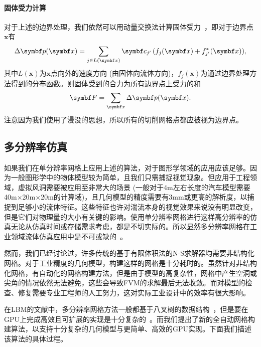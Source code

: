 \paragraph{固体受力计算}
对于上述的边界处理，我们依然可以用动量交换法计算固体受力~\cite{Ladd-1994, Mei-2002}，即对于边界点$\bm{x}$有
\begin{equation}
    \Delta \bm{p}(\bm{x})= \sum_{j\in L(\bm{x})} \bm{c}_{j'}\,(f_{j}(\bm{x}) + f^*_{j'}(\bm{x})),\vspace*{-1.5mm}
\end{equation}
其中$L(\bm{x})$为$\bm{x}$点向外的速度方向 (由固体向流体方向)，$f_{j}(\bm{x})$为通过边界处理方法得到的分布函数。则固体受到的合力为所有边界点上受力的和
\begin{equation}
    \bm{F} = \sum_{\bm{x}} \Delta \bm{p}(\bm{x}).\vspace*{-1mm}
\end{equation}
注意因为我们使用了浸没的思想，所以所有的切削网格点都应被视为边界点。

\subsection{多分辨率仿真}
\label{sec:multi-res}
如果我们在单分辨率网格上应用上述的算法，对于图形学领域的应用应该足够。因为一般图形学中的物体模型较为简单，且我们只需捕捉视觉现象。但应用于工程领域，虚拟风洞需要被应用至非常大的场景 (一般对于4m左右长度的汽车模型需要40m$\times$20m$\times$20m的计算域)，且几何模型的精度需要有3mm或更高的解析度，以捕捉到足够小的流体特征。这些特征也许对湍流本身的视觉效果来说没有明显改变，但是它们对物理量的大小有关键的影响。使用单分辨率网格进行这样高分辨率的仿真无论从仿真时间或存储需求考虑，都是不切实际的。所以显然多分辨率网格在工业领域流体仿真应用中是不可或缺的~\cite{Hou-2019,Aultman-2022,Romani-2022}。

然而，我们已经讨论过，许多传统的基于有限体积法的N-S求解器均需要非结构化网格。对于工业精度的几何模型，构建这样的网格是十分耗时的。虽然针对非结构化网格，有自动化的网格构建方法，但是由于模型的高复杂性，网格中产生空洞或尖角的情况依然无法避免，这些会导致FVM的求解最后无法收敛。而对模型的检查、修复需要专业工程师的人工努力，这对实际工业设计中的效率有很大影响。

在LBM的文献中，多分辨率网格方法一般都基于八叉树的数据结构~\cite{EitelAmor-2013,Hasert-2014}，但是要在GPU上完成高效且可扩展的实现是十分复杂的~\cite{Schornbaum-2016, Schornbaum-2018}。而我们提出了新的全自动网格构建算法，以支持十分复杂的几何模型与更简单、高效的GPU实现。下面我们描述该算法的具体过程。

